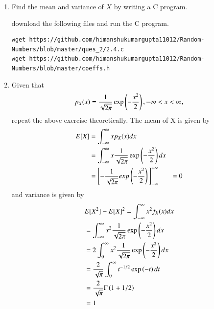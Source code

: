 \documentclass[journal,12pt,twocolumn]{IEEEtran}
\renewcommand\thesection{\arabic{section}}
\begin{document}
\begin{enumerate}[label=\thesection.\arabic*
		,ref=\thesection.\theenumi]
		\solution The PDF of $X$ is plotted in Fig. \ref{fig:gauss_pdf} using the below python code
		\begin{lstlisting}
wget
https://github.com/himanshukumargupta11012/Random-Numbers/blob/master/ques_2/2.2.py
		\end{lstlisting}
		Properties of PDF:
		\begin{enumerate}
			\item It is always non-negative
			\item It is always bounded between 0 to 1
			\item Always symmetric about the mean.
			\item Maxima is observed at mean
			\item Area under the curve of PDF is always equal to 1
		\end{enumerate}
		\begin{figure}
			\centering
			\texttt{[image: ./ques\_2/gau\_cdf.png]}
			\caption{The CDF of $X$}
			\label{fig:gauss_cdf}
		\end{figure}
		\begin{figure}
			\centering
			\texttt{[image: ./ques\_2/gau\_pdf.png]}
			\caption{The PDF of $X$}
			\label{fig:gauss_pdf}
		\end{figure}
		\item Find the mean and variance of $X$ by writing a C program.
		
		\solution download the following files and run the C program.
		\begin{lstlisting}
wget https://github.com/himanshukumargupta11012/Random-Numbers/blob/master/ques_2/2.4.c
wget https://github.com/himanshukumargupta11012/Random-Numbers/blob/master/coeffs.h
		\end{lstlisting}
		\item Given that 
		\begin{align}
			p_{X}(x) = \frac{1}{\sqrt{2\pi}}\exp\left(-\frac{x^2}{2}\right), -\infty < x < \infty,
		\end{align}
		repeat the above exercise theoretically.
		\solution The mean of X is given by
		\begin{align}
			E[X]&=\int_{-\infty}^\infty xp_X(x)dx\\
			&=\int_{-\infty}^\infty x\frac{1}{\sqrt{2\pi}}\exp\left(-\frac{x^2}{2}\right)dx\\
			&=\Biggl[-\frac{1}{\sqrt{2\pi}}exp\left(-\frac{x^2}{2}\right)\Biggl]_{-\infty}^{+\infty}
			&=0
		\end{align}
		and variance is given by
		\begin{align}
			&E[X^2]-E[X]^2=\int_{-\infty}^\infty x^2f_X(x)dx\\
			&=\int_{-\infty}^\infty x^2\frac{1}{\sqrt{2\pi}}\exp\left(-\frac{x^2}{2}\right)dx\\
			&=2\int_{0}^\infty x^2\frac{1}{\sqrt{2\pi}}\exp\left(-\frac{x^2}{2}\right)dx\\
			&=\frac{2}{\sqrt{\pi}}\int_{0}^\infty t^{-1/2}\exp\left(-t\right)dt\\
			&=\frac{2}{\sqrt{\pi}}\Gamma\left(1+1/2\right)\\
			&=1
		\end{align}
		
	\end{enumerate}
\end{document}
